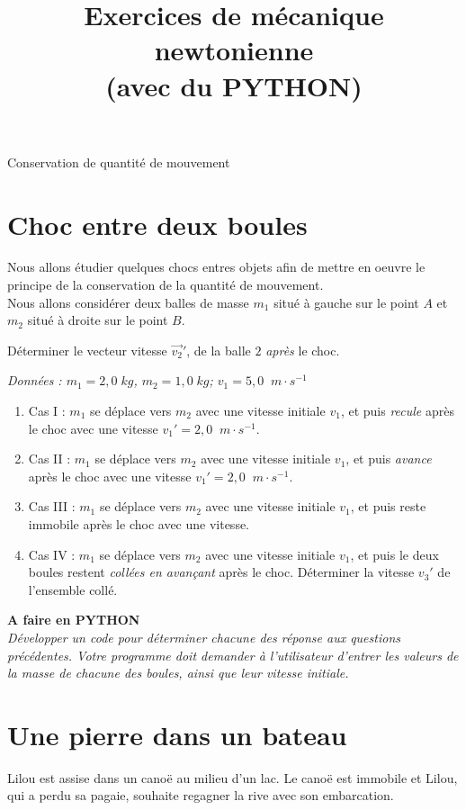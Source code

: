 \documentclass[11pt,a4paper]{article}
\newcommand{\mps}{\; m\cdot s^{-1}}
\newenvironment{python}
 {\begin{shaded} \textbf{A faire en PYTHON}\\ \itshape } { \end{shaded}}
\begin{document}
\title{Exercices de mécanique newtonienne \\ {\small{(avec du PYTHON)}}}
\date{}
\maketitle
\vspace{-1cm}

\noindent
\xrfill[0.7ex]{1pt} \quad Conservation de quantité de mouvement \quad \xrfill[0.7ex]{1pt}


\section{Choc entre deux boules}
Nous allons étudier quelques chocs entres objets afin de mettre en oeuvre le principe de la conservation de la quantité de mouvement. 
\\
Nous allons considérer deux balles de masse $m_1$ situé à gauche sur le point $A$ et $m_2$ situé à droite sur le point $B$.

Déterminer le vecteur vitesse $\vec{v_2}'$, de la balle $2$ \textit{après} le choc. 

\textit{Données : $m_1=2,0\; kg$, $m_2=1,0\; kg$; $v_1=5,0\; \mps$}
\begin{enumerate}
    \item Cas I : $m_1$ se déplace vers $m_2$ avec une vitesse initiale $v_1$, et puis \textit{recule} après le choc avec une vitesse $v_1'=2,0 \; \mps$. 
    \item Cas II : $m_1$ se déplace vers $m_2$ avec une vitesse initiale $v_1$, et puis \textit{avance} après le choc avec une vitesse $v_1'=2,0 \; \mps$.
    \item Cas III : $m_1$ se déplace vers $m_2$ avec une vitesse initiale $v_1$, et puis reste immobile après le choc avec une vitesse.
    \item Cas IV : $m_1$ se déplace vers $m_2$ avec une vitesse initiale $v_1$, et puis le deux boules restent \textit{collées en avançant} après le choc. Déterminer la vitesse $v_3'$ de l'ensemble collé.
\end{enumerate}

\begin{python}
Développer un code pour déterminer chacune des réponse aux questions précédentes. Votre programme doit demander à l'utilisateur d'entrer les valeurs de la masse de chacune des boules, ainsi que leur vitesse initiale. 
\end{python}

\section{Une pierre dans un bateau}
Lilou est assise dans un canoë au milieu d’un lac. Le canoë est immobile et Lilou, qui a perdu sa pagaie, souhaite regagner la rive avec son embarcation.
\end{document}
